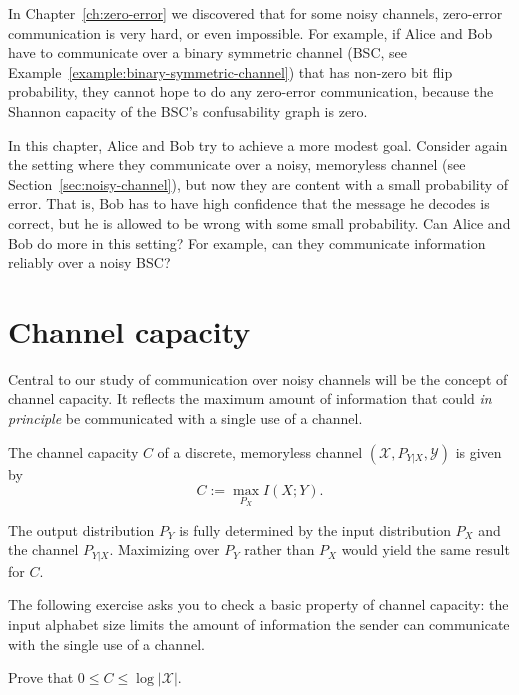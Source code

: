 

In Chapter~\ref{ch:zero-error} we discovered that for some noisy channels, zero-error communication is very hard, or even impossible. For example, if Alice and Bob have to communicate over a binary symmetric channel (BSC, see Example~\ref{example:binary-symmetric-channel}) that has non-zero bit flip probability, they cannot hope to do any zero-error communication, because the Shannon capacity of the BSC's confusability graph is zero.

In this chapter, Alice and Bob try to achieve a more modest goal. Consider again the setting where they communicate over a noisy, memoryless channel (see Section~\ref{sec:noisy-channel}), but now they are content with a small probability of error. That is, Bob has to have high confidence that the message he decodes is correct, but he is allowed to be wrong with some small probability. Can Alice and Bob do more in this setting? For example, can they communicate information reliably over a noisy BSC?

\section{Channel capacity}
Central to our study of communication over noisy channels will be the concept of channel capacity. It reflects the maximum amount of information that could \emph{in principle} be communicated with a single use of a channel.

\begin{definition}
The channel capacity $C$ of a discrete, memoryless channel $(\mathcal{X}, P_{Y|X}, \mathcal{Y})$ is given by
\[
C:= \max_{P_X} I(X;Y).
\]
\end{definition}
The output distribution $P_Y$ is fully determined by the input distribution $P_X$ and the channel $P_{Y|X}$. Maximizing over $P_Y$ rather than $P_X$ would yield the same result for $C$.

The following exercise asks you to check a basic property of channel capacity: the input alphabet size limits the amount of information the sender can communicate with the single use of a channel.

\begin{exercise}
Prove that $0 \leq C \leq \log |\mathcal{X}|$.
\end{exercise}

